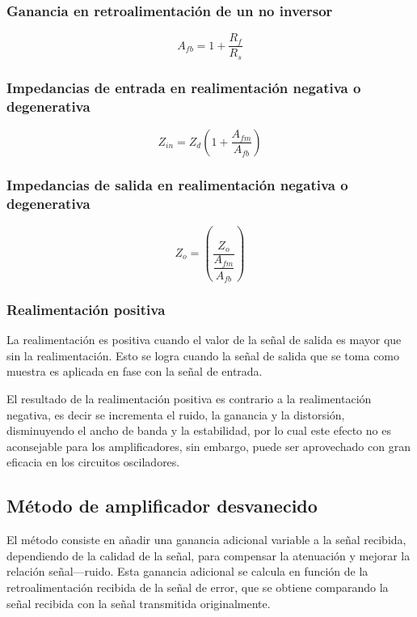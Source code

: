 \subsubsection{Ganancia en retroalimentación de un no inversor}
\begin{equation}
    A_{fb}=1+\dfrac{R_f}{R_s}
    \label{eqn:afb}
\end{equation}


\subsubsection{Impedancias de entrada en realimentación negativa o degenerativa}
\begin{equation}
    Z_{in}=Z_d\left(1 +\dfrac{A_{fm}}{A_{fb}}\right)
    \label{eqn:zinfb}
\end{equation}
\subsubsection{Impedancias de salida en realimentación negativa o degenerativa}
\begin{equation}
    Z_{o}=\left(\dfrac{Z_o}{\dfrac{A_{fm}}{A_{fb}}}\right)
    \label{eqn:zofb}
\end{equation}
\subsubsection{Realimentación positiva}

La realimentación es positiva cuando el valor de la señal de salida es mayor que sin la realimentación. Esto se logra cuando la señal de salida que se toma como muestra es
aplicada en fase con la señal de entrada.

El resultado de la realimentación positiva es contrario a la realimentación negativa, es decir se incrementa el ruido, la ganancia y la distorsión, disminuyendo el ancho de banda y la estabilidad, por lo cual este efecto no es aconsejable para los amplificadores, sin embargo, puede ser aprovechado con gran eficacia en los circuitos osciladores.

\subsection{Método de amplificador desvanecido}

El método consiste en añadir una ganancia adicional variable a la señal recibida, dependiendo de la calidad de la señal, para compensar la atenuación y mejorar la relación señal—ruido. Esta ganancia adicional se calcula en función de la retroalimentación recibida de la señal de error, que se obtiene comparando la señal recibida con la señal transmitida originalmente.

